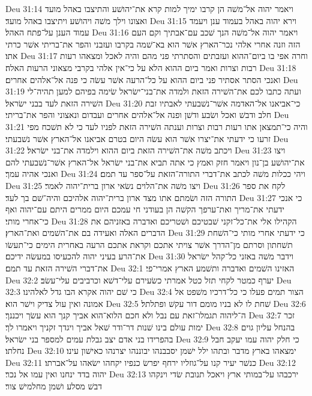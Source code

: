 Deu 31:14  ויאמר יהוה אל־משׁה הן קרבו ימיך למות קרא את־יהושׁע והתיצבו באהל מועד ואצונו וילך משׁה ויהושׁע ויתיצבו באהל מועד׃
Deu 31:15  וירא יהוה באהל בעמוד ענן ויעמד עמוד הענן על־פתח האהל׃
Deu 31:16  ויאמר יהוה אל־משׁה הנך שׁכב עם־אבתיך וקם העם הזה וזנה אחרי אלהי נכר־הארץ אשׁר הוא בא־שׁמה בקרבו ועזבני והפר את־בריתי אשׁר כרתי אתו׃
Deu 31:17  וחרה אפי בו ביום־ההוא ועזבתים והסתרתי פני מהם והיה לאכל ומצאהו רעות רבות וצרות ואמר ביום ההוא הלא על כי־אין אלהי בקרבי מצאוני הרעות האלה׃
Deu 31:18  ואנכי הסתר אסתיר פני ביום ההוא על כל־הרעה אשׁר עשׂה כי פנה אל־אלהים אחרים׃
Deu 31:19  ועתה כתבו לכם את־השׁירה הזאת ולמדה את־בני־ישׂראל שׂימה בפיהם למען תהיה־לי השׁירה הזאת לעד בבני ישׂראל׃
Deu 31:20  כי־אביאנו אל־האדמה אשׁר־נשׁבעתי לאבתיו זבת חלב ודבשׁ ואכל ושׂבע ודשׁן ופנה אל־אלהים אחרים ועבדום ונאצוני והפר את־בריתי׃
Deu 31:21  והיה כי־תמצאן אתו רעות רבות וצרות וענתה השׁירה הזאת לפניו לעד כי לא תשׁכח מפי זרעו כי ידעתי את־יצרו אשׁר הוא עשׂה היום בטרם אביאנו אל־הארץ אשׁר נשׁבעתי׃
Deu 31:22  ויכתב משׁה את־השׁירה הזאת ביום ההוא וילמדה את־בני ישׂראל׃
Deu 31:23  ויצו את־יהושׁע בן־נון ויאמר חזק ואמץ כי אתה תביא את־בני ישׂראל אל־הארץ אשׁר־נשׁבעתי להם ואנכי אהיה עמך׃
Deu 31:24  ויהי ככלות משׁה לכתב את־דברי התורה־הזאת על־ספר עד תמם׃
Deu 31:25  ויצו משׁה את־הלוים נשׂאי ארון ברית־יהוה לאמר׃
Deu 31:26  לקח את ספר התורה הזה ושׂמתם אתו מצד ארון ברית־יהוה אלהיכם והיה־שׁם בך לעד׃
Deu 31:27  כי אנכי ידעתי את־מריך ואת־ערפך הקשׁה הן בעודני חי עמכם היום ממרים היתם עם־יהוה ואף כי־אחרי מותי׃
Deu 31:28  הקהילו אלי את־כל־זקני שׁבטיכם ושׁטריכם ואדברה באזניהם את הדברים האלה ואעידה בם את־השׁמים ואת־הארץ׃
Deu 31:29  כי ידעתי אחרי מותי כי־השׁחת תשׁחתון וסרתם מן־הדרך אשׁר צויתי אתכם וקראת אתכם הרעה באחרית הימים כי־תעשׂו את־הרע בעיני יהוה להכעיסו במעשׂה ידיכם׃
Deu 31:30  וידבר משׁה באזני כל־קהל ישׂראל את־דברי השׁירה הזאת עד תמם׃
Deu 32:1  האזינו השׁמים ואדברה ותשׁמע הארץ אמרי־פי׃
Deu 32:2  יערף כמטר לקחי תזל כטל אמרתי כשׂעירם עלי־דשׁא וכרביבים עלי־עשׂב׃
Deu 32:3  כי שׁם יהוה אקרא הבו גדל לאלהינו׃
Deu 32:4  הצור תמים פעלו כי כל־דרכיו משׁפט אל אמונה ואין עול צדיק וישׁר הוא׃
Deu 32:5  שׁחת לו לא בניו מומם דור עקשׁ ופתלתל׃
Deu 32:6  ה־ליהוה תגמלו־זאת עם נבל ולא חכם הלוא־הוא אביך קנך הוא עשׂך ויכננך׃
Deu 32:7  זכר ימות עולם בינו שׁנות דר־ודר שׁאל אביך ויגדך זקניך ויאמרו לך׃
Deu 32:8  בהנחל עליון גוים בהפרידו בני אדם יצב גבלת עמים למספר בני ישׂראל׃
Deu 32:9  כי חלק יהוה עמו יעקב חבל נחלתו׃
Deu 32:10  ימצאהו בארץ מדבר ובתהו ילל ישׁמן יסבבנהו יבוננהו יצרנהו כאישׁון עינו׃
Deu 32:11  כנשׁר יעיר קנו על־גוזליו ירחף יפרשׂ כנפיו יקחהו ישׂאהו על־אברתו׃
Deu 32:12  יהוה בדד ינחנו ואין עמו אל נכר׃
Deu 32:13  ירכבהו על־במותי ארץ ויאכל תנובת שׂדי וינקהו דבשׁ מסלע ושׁמן מחלמישׁ צור׃
